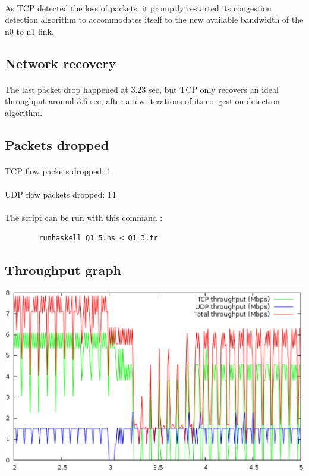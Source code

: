 \documentclass[a4paper]{article}
\begin{document}
    \paragraph{}As TCP detected the loss of packets, it promptly restarted its
congestion detection algorithm to accommodates itself to the new available
bandwidth of the n0 to n1 link.

   \subsection{Network recovery}
   \label{Network recovery}

   \paragraph{}The last packet drop happened at 3.23 sec, but TCP only recovers
an ideal throughput around 3.6 sec, after a few iterations of its congestion
detection algorithm.

   \subsection{Packets dropped}

   \paragraph{}TCP flow packets dropped: 1
   \paragraph{}UDP flow packets dropped: 14

    \paragraph{}The script can be run with this command :
    \begin{verbatim}
        runhaskell Q1_5.hs < Q1_3.tr
    \end{verbatim}

   \subsection{Throughput graph}

    \begin{center}
        \includegraphics[width=\textwidth]{question1/Q1_6.eps}
    \end{center}
\end{document}
